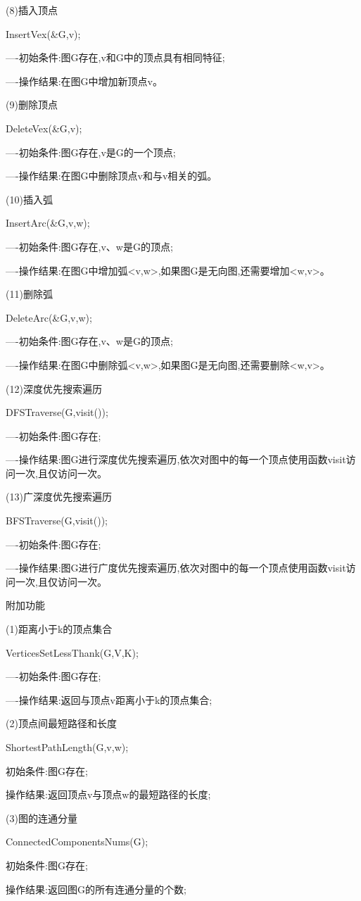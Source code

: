 \documentclass[supercite]{Experimental_Report}
\theoremstyle{definition}
\begin{document}
(8)插入顶点

InsertVex(\&G,v);

----初始条件:图G存在,v和G中的顶点具有相同特征;

----操作结果:在图G中增加新顶点v。

(9)删除顶点

DeleteVex(\&G,v);

----初始条件:图G存在,v是G的一个顶点;

----操作结果:在图G中删除顶点v和与v相关的弧。

(10)插入弧

InsertArc(\&G,v,w);

----初始条件:图G存在,v、w是G的顶点;

----操作结果:在图G中增加弧<v,w>,如果图G是无向图,还需要增加<w,v>。

(11)删除弧

DeleteArc(\&G,v,w);

----初始条件:图G存在,v、w是G的顶点;

----操作结果:在图G中删除弧<v,w>,如果图G是无向图,还需要删除<w,v>。

(12)深度优先搜索遍历

DFSTraverse(G,visit());

----初始条件:图G存在;

----操作结果:图G进行深度优先搜索遍历,依次对图中的每一个顶点使用函数visit访问一次,且仅访问一次。

(13)广深度优先搜索遍历

BFSTraverse(G,visit());

----初始条件:图G存在;

----操作结果:图G进行广度优先搜索遍历,依次对图中的每一个顶点使用函数visit访问一次,且仅访问一次。

附加功能

(1)距离小于k的顶点集合

VerticesSetLessThank(G,V,K);

----初始条件:图G存在;

----操作结果:返回与顶点v距离小于k的顶点集合;

(2)顶点间最短路径和长度

ShortestPathLength(G,v,w); 

初始条件:图G存在;

操作结果:返回顶点v与顶点w的最短路径的长度;

(3)图的连通分量

ConnectedComponentsNums(G);

初始条件:图G存在;

操作结果:返回图G的所有连通分量的个数;
\end{document}
